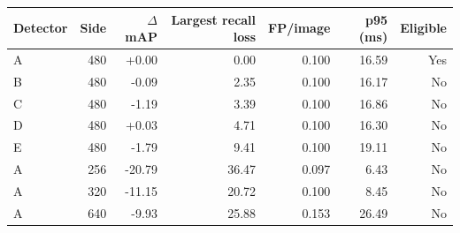 \begin{tabular}{lrrrrrr}
\hline
Detector & Side & $\Delta$mAP & Largest recall loss & FP/image & p95 (ms) & Eligible \\
\hline
A & 480 & +0.00 & 0.00 & 0.100 & 16.59 & Yes \\
B & 480 & -0.09 & 2.35 & 0.100 & 16.17 & No \\
C & 480 & -1.19 & 3.39 & 0.100 & 16.86 & No \\
D & 480 & +0.03 & 4.71 & 0.100 & 16.30 & No \\
E & 480 & -1.79 & 9.41 & 0.100 & 19.11 & No \\
A & 256 & -20.79 & 36.47 & 0.097 & 6.43 & No \\
A & 320 & -11.15 & 20.72 & 0.100 & 8.45 & No \\
A & 640 & -9.93 & 25.88 & 0.153 & 26.49 & No \\
\hline
\end{tabular}
